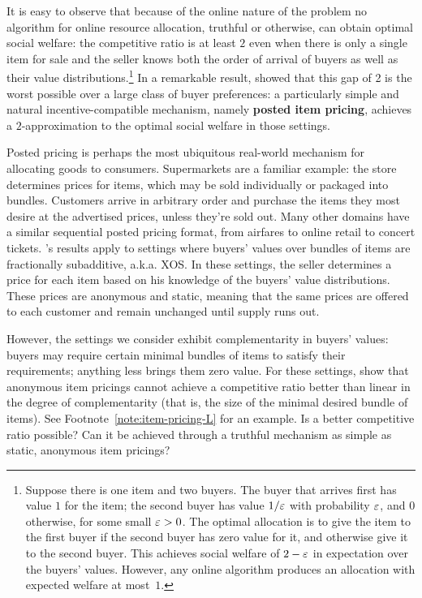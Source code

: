 It is easy to observe that because of the online nature of the problem
no algorithm for online resource allocation, truthful or otherwise,
can obtain optimal social welfare: the competitive ratio is at least
$2$ even when there is only a single item for sale and the seller
knows both the order of arrival of buyers as well as their value
distributions.\footnote{Suppose there is one item and two buyers. The
  buyer that arrives first has value $1$ for the item; the second
  buyer has value $1/\varepsilon$ with probability $\varepsilon$, and $0$ otherwise,
  for some small $\varepsilon>0$. The optimal allocation is to give the item
  to the first buyer if the second buyer has zero value for it, and
  otherwise give it to the second buyer. This achieves social welfare
  of $2-\varepsilon$ in expectation over the buyers' values. However, any
  online algorithm produces an allocation with expected welfare at
  most~$1$.}  In a remarkable result, \citet{FGL15} showed that this
gap of 2 is the worst possible over a large class of buyer
preferences: a particularly simple and natural incentive-compatible
mechanism, namely {\bf posted item pricing}, achieves a
$2$-approximation to the optimal social welfare in those settings.

Posted pricing is perhaps the most ubiquitous real-world mechanism for
allocating goods to consumers. Supermarkets are a familiar example:
the store determines prices for items, which may be sold individually
or packaged into bundles. Customers arrive in arbitrary order and
purchase the items they most desire at the advertised prices, unless
they're sold out. Many other domains have a similar sequential posted
pricing format, from airfares to online retail to concert tickets.
\citeauthor{FGL15}'s results apply to settings where buyers' values
over bundles of items are fractionally subadditive, a.k.a. XOS. In
these settings, the seller determines a price for each item based on
his knowledge of the buyers' value distributions. These prices
are anonymous and static, meaning that the same prices are offered to
each customer and remain unchanged until supply runs out.

However, the settings we consider exhibit complementarity in buyers' values:
buyers may require certain minimal bundles of items to satisfy their
requirements; anything less brings them zero value. For these settings,
\citet{FGL15} show that anonymous item pricings cannot achieve a competitive
ratio better than linear in the degree of complementarity (that is, the size of
the minimal desired bundle of items). See Footnote~\ref{note:item-pricing-L}
for an example. Is a better competitive ratio possible? Can it be achieved
through a truthful mechanism as simple as static, anonymous item pricings?

